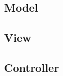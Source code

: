 \subsection{Model}
\label{subsec:model}



\subsection{View}
\label{subsec:view}



\subsection{Controller}
\label{subsec:controller}









